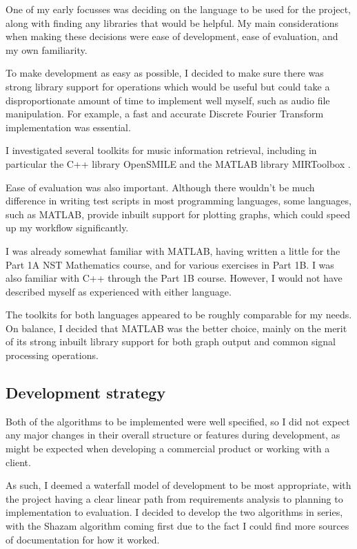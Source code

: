 \documentclass[12pt,a4paper,twoside,openright]{report}
\begin{document}
One of my early focusses was deciding on the language to be used for the project, along with finding any libraries that would be helpful. My main considerations when making these decisions were ease of development, ease of evaluation, and my own familiarity.

To make development as easy as possible, I decided to make sure there was strong library support for operations which would be useful but could take a disproportionate amount of time to implement well myself, such as audio file manipulation. For example, a fast and accurate Discrete Fourier Transform implementation was essential.

I investigated several toolkits for music information retrieval, including in particular the C++ library OpenSMILE \cite{Eyben10} and the MATLAB library MIRToolbox \cite{Lartillot07}.

Ease of evaluation was also important. Although there wouldn't be much difference in writing test scripts in most programming languages, some languages, such as MATLAB, provide inbuilt support for plotting graphs, which could speed up my workflow significantly.

I was already somewhat familiar with MATLAB, having written a little for the Part 1A NST Mathematics course, and for various exercises in Part 1B. I was also familiar with C++ through the Part 1B course. However, I would not have described myself as experienced with either language.

The toolkits for both languages appeared to be roughly comparable for my needs. On balance, I decided that MATLAB was the better choice, mainly on the merit of its strong inbuilt library support for both graph output and common signal processing operations.


\subsection{Development strategy}
\label{section:devstrat}

Both of the algorithms to be implemented were well specified, so I did not expect any major changes in their overall structure or features during development, as might be expected when developing a commercial product or working with a client. 

As such, I deemed a waterfall model of development to be most appropriate, with the project having a clear linear path from requirements analysis to planning to implementation to evaluation. I decided to develop the two algorithms in series, with the Shazam algorithm coming first due to the fact I could find more sources of documentation for how it worked.
\end{document}
